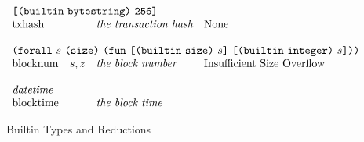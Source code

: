 \documentclass[../main.tex]{subfiles}
\begin{document}
\begin{figure*}[t]
\[\begin{array}{llll}
        \multicolumn{4}{l}{\appT{\builtinT{\builtinBytestringType{}}}{\size{256}}}\\
        \mathrm{txhash} & & \textit{the transaction hash}   &   \textrm{None}  \\
        &&\\
        
        \multicolumn{4}{l}{
          \forallT{s}{\sizeK{}}{
            \funT{\appT{\builtinT{\builtinSizeType{}}}{s}}
                 {\appT{\builtinT{\builtinIntegerType{}}}{s}}}}\\
        \mathrm{blocknum} & s, z & \textit{the block number}   &   \textrm{Insufficient Size Overflow}  \\
        &&\\
        
        \multicolumn{4}{l}{\mathit{datetime}}\\
        \mathrm{blocktime} & & \textit{the block time}   &   \textrm{}  \\
    \end{array}\]
    \normalsize
    \caption{Builtin Types and Reductions}
    \label{fig:Plutus_core_builtins}
\end{figure*}
\end{document}

